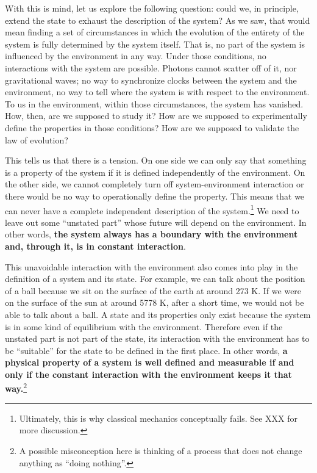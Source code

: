 \documentclass[11pt]{article}
\begin{document}
With this is mind, let us explore the following question: could we, in principle, extend the state to exhaust the description of the system? As we saw, that would mean finding a set of circumstances in which the evolution of the entirety of the system is fully determined by the system itself. That is, no part of the system is influenced by the environment in any way. Under those conditions, no interactions with the system are possible. Photons cannot scatter off of it, nor gravitational waves; no way to synchronize clocks between the system and the environment, no way to tell where the system is with respect to the environment. To us in the environment, within those circumstances, the system has vanished. How, then, are we supposed to study it? How are we supposed to experimentally define the properties in those conditions? How are we supposed to validate the law of evolution?

This tells us that there is a tension. On one side we can only say that something is a property of the system if it is defined independently of the environment. On the other side, we cannot completely turn off system-environment interaction or there would be no way to operationally define the property. This means that we can never have a complete independent description of the system.\footnote{Ultimately, this is why classical mechanics conceptually fails. See XXX for more discussion.} We need to leave out some ``unstated part'' whose future will depend on the environment. In other words, \textbf{the system always has a boundary with the environment and, through it, is in constant interaction}.

This unavoidable interaction with the environment also comes into play in the definition of a system and its state. For example, we can talk about the position of a ball because we sit on the surface of the earth at around 273 K. If we were on the surface of the sun at around 5778 K, after a short time, we would not be able to talk about a ball. A state and its properties only exist because the system is in some kind of equilibrium with the environment. Therefore even if the unstated part is not part of the state, its interaction with the environment has to be ``suitable'' for the state to be defined in the first place. In other words, \textbf{a physical property of a system is well defined and measurable if and only if the constant interaction with the environment keeps it that way.}\footnote{A possible misconception here is thinking of a process that does not change anything as ``doing nothing''.}
\end{document}

